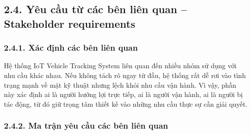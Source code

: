 \documentclass[a4paper]{extarticle}
\begin{document}
\subsection{2.4. Yêu cầu từ các bên liên quan -- Stakeholder
requirements}\label{24-yuxeau-cux1ea7u-tux1eeb-cuxe1c-buxean-liuxean-quan--stakeholder-requirements}

\subsubsection{2.4.1. Xác định các bên liên
quan}\label{241-xuxe1c-ux111ux1ecbnh-cuxe1c-buxean-liuxean-quan}

Hệ thống IoT Vehicle Tracking System liên quan đến nhiều nhóm sử dụng với
nhu cầu khác nhau. Nếu không tách rõ ngay từ đầu, hệ thống rất dễ rơi vào
tình trạng mạnh về mặt kỹ thuật nhưng lệch khỏi nhu cầu vận hành. Vì vậy,
phần này xác định ai là người hưởng lợi trực tiếp, ai là người vận hành,
ai là người bị tác động, từ đó giữ trọng tâm thiết kế vào những nhu cầu
thực sự cần giải quyết.

\subsubsection{2.4.2. Ma trận yêu cầu các bên liên
quan}\label{242-ma-trux1eadn-yuxeau-cux1ea7u-cuxe1c-buxean-liuxean-quan}
\end{document}
